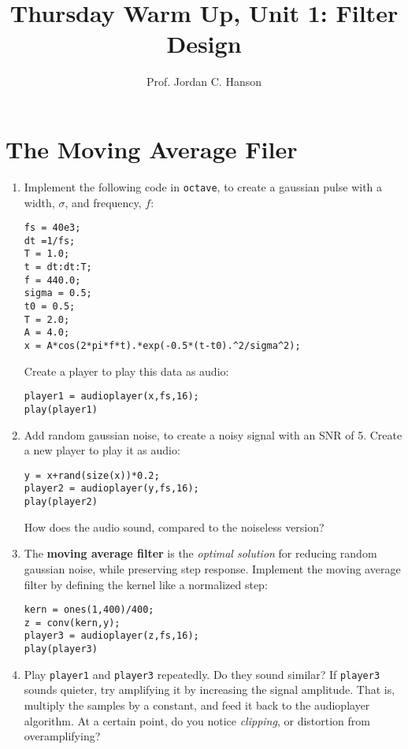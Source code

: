 \documentclass{article}
\begin{document}
\twocolumn

\title{Thursday Warm Up, Unit 1: Filter Design}
\author{Prof. Jordan C. Hanson}
\maketitle

\section{The Moving Average Filer}

\begin{enumerate}
\item Implement the following code in \verb+octave+, to create a gaussian pulse with a width, $\sigma$, and frequency, $f$:
\begin{verbatim}
fs = 40e3;
dt =1/fs;
T = 1.0;
t = dt:dt:T;
f = 440.0;
sigma = 0.5;
t0 = 0.5;
T = 2.0;
A = 4.0;
x = A*cos(2*pi*f*t).*exp(-0.5*(t-t0).^2/sigma^2);
\end{verbatim}
Create a player to play this data as audio:
\begin{verbatim}
player1 = audioplayer(x,fs,16);
play(player1)
\end{verbatim}
\item Add random gaussian noise, to create a noisy signal with an SNR of 5.  Create a new player to play it as audio:
\begin{verbatim}
y = x+rand(size(x))*0.2;
player2 = audioplayer(y,fs,16);
play(player2)
\end{verbatim}
How does the audio sound, compared to the noiseless version?
\item The \textbf{moving average filter} is the \textit{optimal solution} for reducing random gaussian noise, while preserving step response.  Implement the moving average filter by defining the kernel like a normalized step:
\begin{verbatim}
kern = ones(1,400)/400;
z = conv(kern,y);
player3 = audioplayer(z,fs,16);
play(player3)
\end{verbatim}
\item Play \verb+player1+ and \verb+player3+ repeatedly.  Do they sound similar?  If \verb+player3+ sounds quieter, try amplifying it by increasing the signal amplitude.  That is, multiply the samples by a constant, and feed it back to the audioplayer algorithm.  At a certain point, do you notice \textit{clipping}, or distortion from overamplifying?
\end{enumerate}
\end{document}

